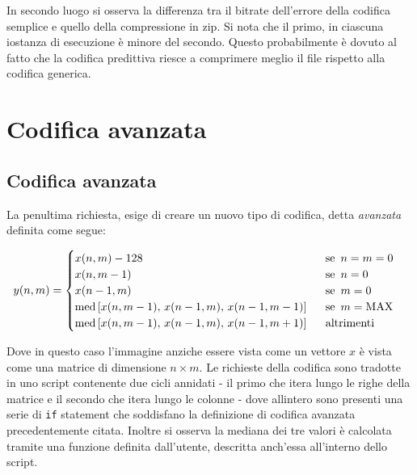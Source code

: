 In secondo luogo si osserva la differenza tra il bitrate dell'errore della codifica semplice e quello della compressione in zip. Si nota che il primo, in ciascuna iostanza di esecuzione è minore del secondo. Questo probabilmente è dovuto al fatto che la codifica predittiva riesce a comprimere meglio il file rispetto alla codifica generica. 





\newpage\section{Codifica avanzata}

\vspace{15px}\subsection{Codifica avanzata}

La penultima richiesta, esige di creare un nuovo tipo di codifica, detta \textsl{avanzata} definita come segue:

\begin{gather*}
    y(n, m) = 
    \begin{cases}
        x(n, m) - 128 \hspace{161px} \text{se } \, n = m = 0 \\
        x(n, m - 1) \hspace{171px} \text{se } \, n = 0\\
        x(n - 1, m) \hspace{171px} \text{se } \, m = 0\\
        \text{med}\left[ x(n, m - 1),\, x(n - 1, m),\, x(n - 1, m - 1) \right] \hspace{15px} \text{se } \, m = \text{MAX}\\
        \text{med}\left[ x(n, m - 1),\, x(n - 1, m),\, x(n - 1, m + 1) \right] \hspace{15px} \text{altrimenti}
    \end{cases}
\end{gather*} 

\noindent Dove in questo caso l'immagine anziche essere vista come un vettore $x$ è vista come una matrice di dimensione $n \times m$. Le richieste della codifica sono tradotte in uno script contenente due cicli annidati - il primo che itera lungo le righe della matrice e il secondo che itera lungo le colonne - dove allintero sono presenti una serie di \texttt{if} statement che soddisfano la definizione di codifica avanzata precedentemente citata. Inoltre si osserva la mediana dei tre valori è calcolata tramite una funzione definita dall'utente, descritta anch'essa all'interno dello script. 

